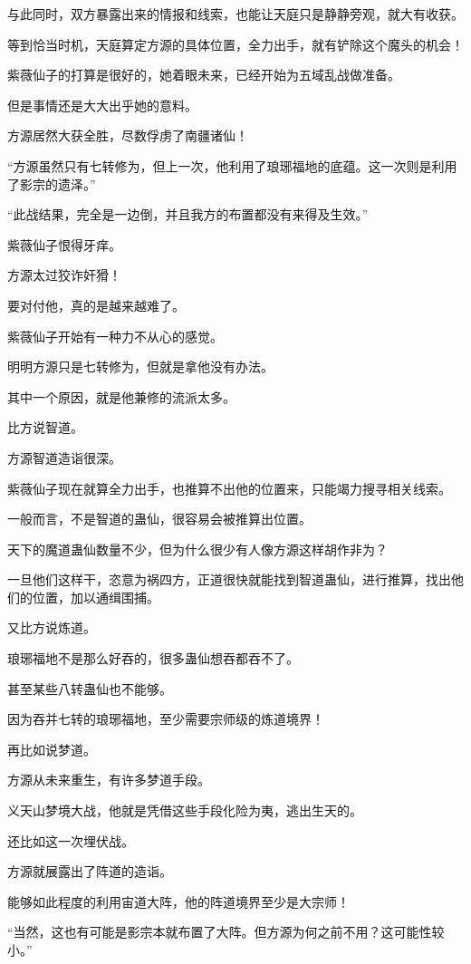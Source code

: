 \begin{this_body}
与此同时，双方暴露出来的情报和线索，也能让天庭只是静静旁观，就大有收获。

等到恰当时机，天庭算定方源的具体位置，全力出手，就有铲除这个魔头的机会！

紫薇仙子的打算是很好的，她着眼未来，已经开始为五域乱战做准备。

但是事情还是大大出乎她的意料。

方源居然大获全胜，尽数俘虏了南疆诸仙！

“方源虽然只有七转修为，但上一次，他利用了琅琊福地的底蕴。这一次则是利用了影宗的遗泽。”

“此战结果，完全是一边倒，并且我方的布置都没有来得及生效。”

紫薇仙子恨得牙痒。

方源太过狡诈奸猾！

要对付他，真的是越来越难了。

紫薇仙子开始有一种力不从心的感觉。

明明方源只是七转修为，但就是拿他没有办法。

其中一个原因，就是他兼修的流派太多。

比方说智道。

方源智道造诣很深。

紫薇仙子现在就算全力出手，也推算不出他的位置来，只能竭力搜寻相关线索。

一般而言，不是智道的蛊仙，很容易会被推算出位置。

天下的魔道蛊仙数量不少，但为什么很少有人像方源这样胡作非为？

一旦他们这样干，恣意为祸四方，正道很快就能找到智道蛊仙，进行推算，找出他们的位置，加以通缉围捕。

又比方说炼道。

琅琊福地不是那么好吞的，很多蛊仙想吞都吞不了。

甚至某些八转蛊仙也不能够。

因为吞并七转的琅琊福地，至少需要宗师级的炼道境界！

再比如说梦道。

方源从未来重生，有许多梦道手段。

义天山梦境大战，他就是凭借这些手段化险为夷，逃出生天的。

还比如这一次埋伏战。

方源就展露出了阵道的造诣。

能够如此程度的利用宙道大阵，他的阵道境界至少是大宗师！

“当然，这也有可能是影宗本就布置了大阵。但方源为何之前不用？这可能性较小。”


\end{this_body}

